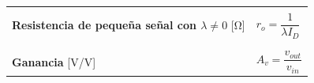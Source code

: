 \documentclass[10pt]{article}
\begin{document}
\begin{table}
\begin{tabular}{|p{5cm}|l|}
		                                                                                                                                                                                                                                                                                             &                                                                                                                                       \\
		\hline
		                                                                                                                                                                                                                                                                                             &                                                                                                                                       \\
		\textbf{Resistencia de pequeña señal con $\lambda \ne 0$} [\si{\ohm}]                                                                                                                                                                                                                        & $r_o = \dfrac{1}{\lambda I_D}$                                                                                                        \\
		                                                                                                                                                                                                                                                                                             &                                                                                                                                       \\
		\hline
		                                                                                                                                                                                                                                                                                             &                                                                                                                                       \\
		\textbf{Ganancia} [\si{\volt/\volt}]                                                                                                                                                                                                                                                         & $A_v = \dfrac{v_{out}}{v_{in}}$                                                                                                       \\

\end{tabular}
\end{table}
\end{document}
